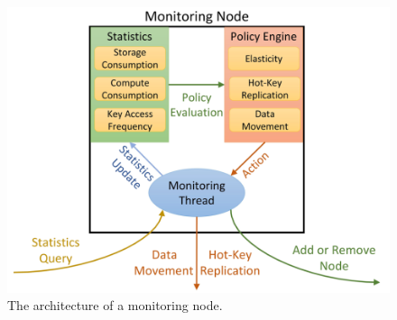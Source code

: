 \documentclass[14pt,oneside]{extreport}
\begin{document}
  \begin{figure}[H]
    \centerline{\includegraphics[scale=0.5]{images/paper2/monitoring_node.png}}
    \caption{The architecture of a monitoring node.}
    \label{The architecture of a monitoring node.}
  \end{figure}
\end{document}
